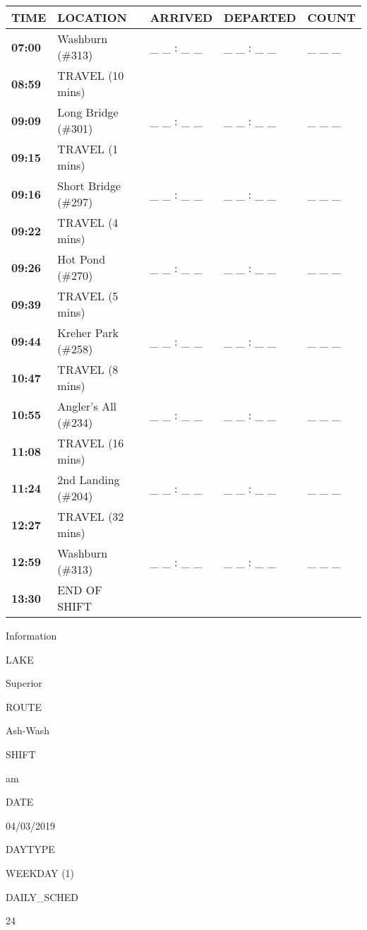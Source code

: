 \documentclass[]{article}
\begin{document}
\begin{tabular}{>{\bfseries}lllll}
\toprule
\textbf{TIME} & \textbf{LOCATION} & \textbf{ARRIVED} & \textbf{DEPARTED} & \textbf{COUNT}\\
\midrule
07:00 & Washburn (\#313) & \_ \_ : \_ \_ & \_ \_ : \_ \_ & \_ \_ \_\\
08:59 & TRAVEL (10 mins) &  &  & \\
09:09 & Long Bridge (\#301) & \_ \_ : \_ \_ & \_ \_ : \_ \_ & \_ \_ \_\\
09:15 & TRAVEL (1 mins) &  &  & \\
09:16 & Short Bridge (\#297) & \_ \_ : \_ \_ & \_ \_ : \_ \_ & \_ \_ \_\\
09:22 & TRAVEL (4 mins) &  &  & \\
09:26 & Hot Pond (\#270) & \_ \_ : \_ \_ & \_ \_ : \_ \_ & \_ \_ \_\\
09:39 & TRAVEL (5 mins) &  &  & \\
09:44 & Kreher Park (\#258) & \_ \_ : \_ \_ & \_ \_ : \_ \_ & \_ \_ \_\\
10:47 & TRAVEL (8 mins) &  &  & \\
10:55 & Angler's All (\#234) & \_ \_ : \_ \_ & \_ \_ : \_ \_ & \_ \_ \_\\
11:08 & TRAVEL (16 mins) &  &  & \\
11:24 & 2nd Landing (\#204) & \_ \_ : \_ \_ & \_ \_ : \_ \_ & \_ \_ \_\\
12:27 & TRAVEL (32 mins) &  &  & \\
12:59 & Washburn (\#313) & \_ \_ : \_ \_ & \_ \_ : \_ \_ & \_ \_ \_\\
13:30 & END OF SHIFT &  &  & \\
\bottomrule
\end{tabular}\newpage

Information

LAKE

Superior

ROUTE

Ash-Wash

SHIFT

am

DATE

04/03/2019

DAYTYPE

WEEKDAY (1)

DAILY\_SCHED

24

\vspace{24pt}
\end{document}
